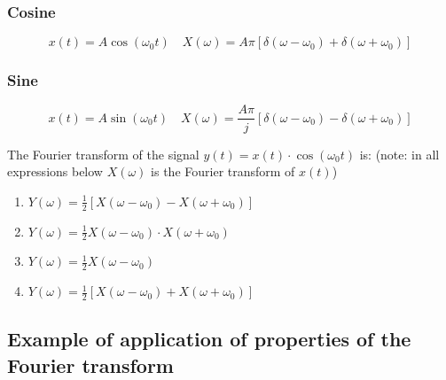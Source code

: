 \subsubsection{Cosine}
\[ x(t)=A\cos(\omega_{0} t)\quad X(\omega)=A\pi[ \delta(\omega-\omega_{0})+ \delta(\omega+\omega_{0})] \]

\subsubsection{Sine}
\[ x(t)=A\sin(\omega_{0} t)\quad X(\omega)=\frac{A \pi}{j}[ \delta(\omega-\omega_{0})- \delta(\omega+\omega_{0})] \]

\begin{q}{}
The Fourier transform of the signal $y(t) = x(t) \cdot \cos(\omega_{0}t)$ is: (note: in all expressions below $X(\omega)$ is the Fourier transform of $x(t)$)
\begin{enumerate}[label=(\alph*)]
    \item $Y(\omega) = \frac{1}{2}[X(\omega - \omega_{0}) - X(\omega + \omega_{0})]$
    \item $Y(\omega) = \frac{1}{2}X(\omega - \omega_{0}) \cdot X(\omega + \omega_{0})$
    \item $Y(\omega) = \frac{1}{2}X(\omega - \omega_{0})$
    \item $Y(\omega) = \frac{1}{2}[X(\omega - \omega_{0}) + X(\omega + \omega_{0})]$
\end{enumerate}
\end{q}

\subsection{Example of application of properties of the Fourier transform}

